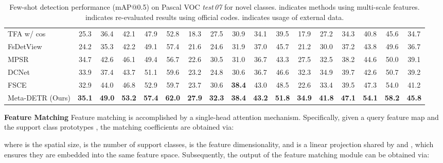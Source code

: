 \documentclass[letterpaper]{article} \usepackage{aaai22}  \usepackage{times}  \usepackage{helvet}  \usepackage{courier}  \usepackage[hyphens]{url}  \usepackage{graphicx} \urlstyle{rm} \def\UrlFont{\rm}  \usepackage{natbib}  \usepackage{caption} \DeclareCaptionStyle{ruled}{labelfont=normalfont,labelsep=colon,strut=off} \frenchspacing  \setlength{\pdfpagewidth}{8.5in}  \setlength{\pdfpageheight}{11in}  \usepackage{algorithm}
\begin{document}
\begin{table*}[t]
\begin{center}
{\begin{tabular}[t]{l|ccccc|ccccc|ccccc|c}
TFA w/ cos\;\cite{fsdet}\, & 25.3 & 36.4 & 42.1 & 47.9 & 52.8 & 18.3 & 27.5 & 30.9 & 34.1 & 39.5 & 17.9 & 27.2 & 34.3 & 40.8 & 45.6 & 34.7 \\

FsDetView\;\cite{FSDetView} & 24.2 & 35.3 & 42.2 & 49.1 & 57.4 & 21.6 & 24.6 & 31.9 & 37.0 & 45.7 & 21.2 & 30.0 & 37.2 & 43.8 & 49.6 & 36.7 \\

MPSR\;\cite{MPSR}\, & 34.7 & 42.6 & 46.1 & 49.4 & 56.7 & 22.6 & 30.5 & 31.0 & 36.7 & 43.3 & 27.5 & 32.5 & 38.2 & 44.6 & 50.0 & 39.1 \\

DCNet\;\cite{DenseRelationDistillation}\, & 33.9 & 37.4 & 43.7 & 51.1 & 59.6 & 23.2 & 24.8 & 30.6 & 36.7 & 46.6 & 32.3 & 34.9 & 39.7 & 42.6 & 50.7 & 39.2 \\

FSCE\;\cite{fsce}\, & 32.9 & 44.0 & 46.8 & 52.9 & 59.7 & 23.7 & 30.6 & \textbf{38.4} & 43.0 & 48.5 & 22.6 & 33.4 & 39.5 & 47.3 & 54.0 & 41.2 \\

\rowcolor{black!6} Meta-DETR (Ours) & \textbf{35.1} & \textbf{49.0} & \textbf{53.2} & \textbf{57.4} & \textbf{62.0} & \textbf{27.9} & \textbf{32.3} & \textbf{38.4} & \textbf{43.2} & \textbf{51.8} & \textbf{34.9} & \textbf{41.8} & \textbf{47.1} & \textbf{54.1} & \textbf{58.2} & \textbf{45.8} \\


\bottomrule[1.1pt]
\end{tabular}}
\end{center}
\vspace*{-3.99mm}
\caption{Few-shot detection performance (mAP@0.5) on Pascal VOC \textit{test\,07} for novel classes.  indicates methods using multi-scale features.  indicates re-evaluated results using official codes.  indicates usage of external data.}
\label{tab:Performance_VOC_novel}
\vspace*{-1.5mm}
\end{table*}


\smallskip
\vspace{+1.00mm}
\noindent\textbf{Feature Matching \;}
Feature matching is accomplished by a single-head attention mechanism. Specifically, given a query feature map  and the support class prototypes , the matching coefficients are obtained via:

where  is the spatial size,  is the number of support classes,  is the feature dimensionality, and  is a linear projection shared by  and , which ensures they are embedded into the same feature space. Subsequently, the output of the feature matching module can be obtained via:
\end{document}
